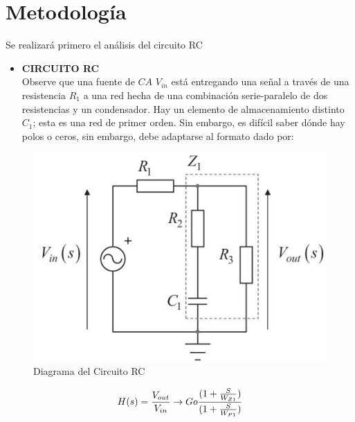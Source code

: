 \documentclass[letterpaper,10pt]{article}
\begin{document}
	
	\pagebreak
    \section{Metodología}
    \vspace*{0.3in}	
    
    Se realizará primero el análisis del circuito RC
    \vspace*{0.3in}
    
    \begin{itemize}
    	\item
    	\textbf{CIRCUITO RC}\vspace*{0.4in}\\
    	Observe que una fuente de $CA$ $V_{in}$ está entregando una señal a través de una resistencia $R_1$ a una red hecha de una combinación serie-paralelo de dos resistencias y un condensador.
    	Hay un elemento de almacenamiento distinto $C_1$; esta es una red de primer orden.
    	Sin embargo, es difícil saber dónde hay polos o ceros, sin embargo, debe
    	adaptarse al formato dado por:
    \end{itemize}
    \vspace*{0.2in}
    	\begin{figure}[h!]
    		\centering
    		\includegraphics[scale=0.4]{CIRCUITORC}
    		\caption{Diagrama del Circuito RC}
    	\end{figure}

        \vspace*{0.3in}
    \begin{equation}
    H(s) = \frac {V_{out}}{V_{in}} \rightarrow Go \frac {(1+ \frac{S}{W_{Z1}})}{(1+ \frac{S}{W_{P1}})}\\  
    \end{equation}
    
\end{document}
